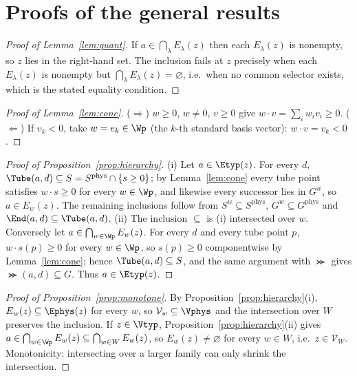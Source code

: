 \appendix

\section{Proofs of the general results}\label{app:general}

\begin{proof}[Proof of Lemma~\ref{lem:quant}]
If $a\in\bigcap_\lambda E_\lambda(z)$ then each $E_\lambda(z)$ is nonempty, so $z$ lies in the right-hand set. The inclusion fails at $z$ precisely when each $E_\lambda(z)$ is nonempty but $\bigcap_\lambda E_\lambda(z)=\varnothing$, i.e.\ when no common selector exists, which is the stated equality condition.
\end{proof}

\begin{proof}[Proof of Lemma~\ref{lem:cone}]
($\Rightarrow$) $w\ge0$, $w\ne0$, $v\ge0$ give $w\cdot v=\sum_iw_iv_i\ge0$. ($\Leftarrow$) If $v_k<0$, take $w=e_k\in\Wp$ (the $k$-th standard basis vector): $w\cdot v=v_k<0$.
\end{proof}

\begin{proof}[Proof of Proposition~\ref{prop:hierarchy}]
(i) Let $a\in\Etyp(z)$. For every $d$, $\Tube(a,d)\subseteq S=S^{\mathrm{phys}}\cap\{s\ge0\}$; by Lemma~\ref{lem:cone} every tube point satisfies $w\cdot s\ge0$ for every $w\in\Wp$, and likewise every successor lies in $G^w$, so $a\in E_w(z)$. The remaining inclusions follow from $S^w\subseteq S^{\mathrm{phys}}$, $G^w\subseteq G^{\mathrm{phys}}$ and $\End(a,d)\subseteq\Tube(a,d)$.
(ii) The inclusion $\subseteq$ is (i) intersected over $w$. Conversely let $a\in\bigcap_{w\in\Wp}E_w(z)$. For every $d$ and every tube point $p$, $w\cdot s(p)\ge0$ for every $w\in\Wp$, so $s(p)\ge0$ componentwise by Lemma~\ref{lem:cone}; hence $\Tube(a,d)\subseteq S$, and the same argument with $\Succ$ gives $\Succ(a,d)\subseteq G$. Thus $a\in\Etyp(z)$.
\end{proof}

\begin{proof}[Proof of Proposition~\ref{prop:monotone}]
By Proposition~\ref{prop:hierarchy}(i), $E_w(z)\subseteq\Ephys(z)$ for every $w$, so $\mathcal V_w\subseteq\Vphys$ and the intersection over $W$ preserves the inclusion. If $z\in\Vtyp$, Proposition~\ref{prop:hierarchy}(ii) gives $a\in\bigcap_{w\in\Wp}E_w(z)\subseteq\bigcap_{w\in W}E_w(z)$, so $E_w(z)\ne\varnothing$ for every $w\in W$, i.e.\ $z\in\mathcal V_W$. Monotonicity: intersecting over a larger family can only shrink the intersection.
\end{proof}

